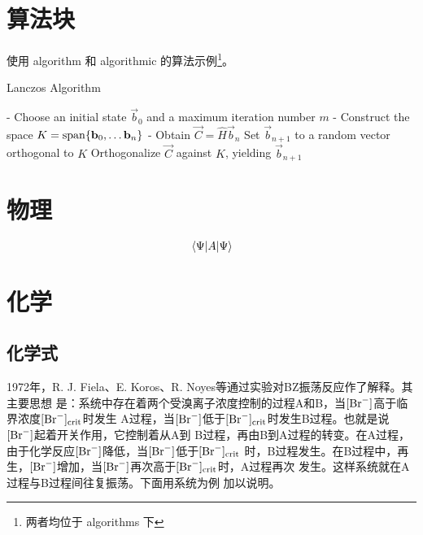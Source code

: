 \section{算法块}

使用 {algorithm} 和 {algorithmic} 的算法示例\footnote{两者均位于 \textsf{algorithms} 下}。

\begin{algorithm}[htbp]
    \caption{Lanczos Algorithm}
    \begin{algorithmic}
        \STATE - Choose an initial state $\vec{b}_0$ and a maximum iteration number $m$
        \STATE - Construct the space $K = \operatorname{span}\{\mathbf{b}_0 , \ldots \mathbf{b}_n \}$
        \STATE - Obtain $\vec{C} = \hat{H} \vec{b}_n$
        \STATE Set $\vec{b}_{n+1}$ to a random vector orthogonal to $K$
        \ELSE
        \STATE Orthogonalize $\vec{C}$ against $K$, yielding $\vec{b}_{n+1}$
        \ENDIF\ENDFOR
    \end{algorithmic}
\end{algorithm}


\section{物理}

\begin{equation}
    \expval{A}{\Psi}
\end{equation}


\section{化学}

\subsection{化学式}

1972年，R. J. Fiela、E. Koros、R. Noyes等通过实验对BZ振荡反应作了解释。其主要思想
是：系统中存在着两个受溴离子浓度控制的过程A和B，当$[\ce{Br-}]$高于临界浓度$[\ce{Br-}]_\text{crit}$时发生
A过程，当$[\ce{Br-}]$低于$[\ce{Br-}]_\text{crit}$时发生B过程。也就是说$[\ce{Br-}]$起着开关作用，它控制着从A到
B过程，再由B到A过程的转变。在A过程，由于化学反应$[\ce{Br-}]$降低，当$[\ce{Br-}]$低于$[\ce{Br-}]_\text{crit}$
时，B过程发生。在B过程中，再生，$[\ce{Br-}]$增加，当$[\ce{Br-}]$再次高于$[\ce{Br-}]_\text{crit}$时，A过程再次
发生。这样系统就在A过程与B过程间往复振荡。下面用系统为例
加以说明。\cite{qiujinhengetal2010}

